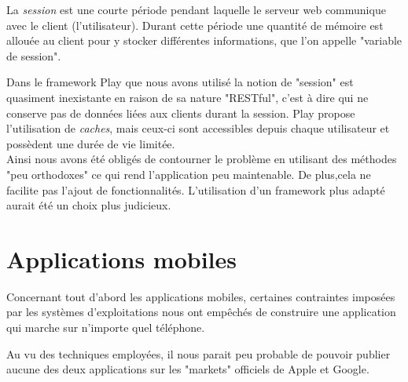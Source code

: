 La \textit{session} est une courte période pendant laquelle le serveur web communique avec le client (l'utilisateur).
Durant cette période une quantité de mémoire est allouée au client pour y stocker différentes informations, que l'on appelle "variable de session".

Dans le framework Play que nous avons utilisé la notion de "session" est quasiment inexistante en raison de sa nature "RESTful", c'est à dire qui ne conserve pas de données liées aux clients durant la session.
Play propose l'utilisation de \textit{caches}, mais ceux-ci sont accessibles depuis chaque utilisateur et possèdent une durée de vie limitée.
\\


Ainsi nous avons été obligés de contourner le problème en utilisant des méthodes "peu orthodoxes" ce qui rend l'application peu maintenable.
De plus,cela ne facilite pas l'ajout de fonctionnalités.
L'utilisation d'un framework plus adapté aurait été un choix plus judicieux.






\section{Applications mobiles}

Concernant tout d'abord les applications mobiles, certaines contraintes imposées par les systèmes d'exploitations nous ont empêchés de construire une application qui marche sur n'importe quel téléphone.

Au vu des techniques employées, il nous parait peu probable de pouvoir publier aucune des
deux applications sur les "markets" officiels de Apple et Google.




